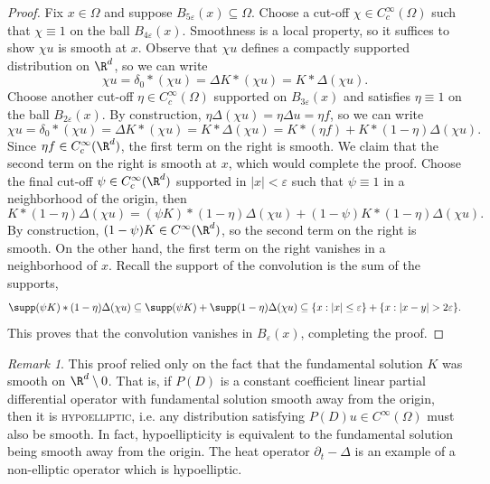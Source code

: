 \documentclass[reqno]{amsart}
\theoremstyle{definition}
\theoremstyle{remark}
\newtheorem*{remark}{Remark}
\renewcommand{\epsilon}{\varepsilon}
\renewcommand{\emph}{\textsc}
\begin{document}
\begin{proof}
	Fix $x \in \Omega$ and suppose $B_{5\epsilon} (x) \subseteq \Omega$. Choose a cut-off $\chi \in C^\infty_c (\Omega)$ such that $\chi \equiv 1$ on the ball $B_{4\epsilon} (x)$. Smoothness is a local property, so it suffices to show $\chi u$ is smooth at $x$. Observe that $\chi u$ defines a compactly supported distribution on $\R^d$, so we can write
		\[ \chi u = \delta_0 * (\chi u) = \Delta K * (\chi u) = K * \Delta (\chi u). \]
	Choose another cut-off $\eta \in C^\infty_c (\Omega)$ supported on $B_{3\epsilon} (x)$ and satisfies $\eta \equiv 1$ on the ball $B_{2\epsilon} (x)$. By construction, $\eta \Delta(\chi u) = \eta \Delta u = \eta f$, so we can write
		\[ \chi u = \delta_0 * (\chi u) = \Delta K * (\chi u) = K * \Delta (\chi u) = K * (\eta f) + K * (1 - \eta) \Delta (\chi u). \]
	Since $\eta f \in C^\infty_c (\R^d)$, the first term on the right is smooth. We claim that the second term on the right is smooth at $x$, which would complete the proof. Choose the final cut-off $\psi \in C^\infty_c (\R^d)$ supported in $|x| < \epsilon$ such that $\psi \equiv 1$ in a neighborhood of the origin, then 
		\[ K * (1 - \eta) \Delta (\chi u) = (\psi K) * (1 - \eta) \Delta (\chi u) + (1 - \psi) K * (1 - \eta) \Delta (\chi u).  \]
	By construction, $(1 - \psi) K \in C^\infty (\R^d)$, so the second term on the right is smooth. On the other hand, the first term on the right vanishes in a neighborhood of $x$. Recall the support of the convolution is the sum of the supports, 
		\[ \supp (\psi K) * (1 - \eta) \Delta (\chi u) \subseteq \supp (\psi K) + \supp (1 - \eta) \Delta (\chi u) \subseteq \{ x:  |x| \leq \epsilon \} + \{ x : |x - y| > 2\epsilon \}. \]
	This proves that the convolution vanishes in $B_\epsilon (x)$, completing the proof. 
\end{proof}

\begin{remark}
	This proof relied only on the fact that the fundamental solution $K$ was smooth on $\R^d \setminus 0$. That is, if $P(D)$ is a constant coefficient linear partial differential operator with fundamental solution smooth away from the origin, then it is \emph{hypoelliptic}, i.e. any distribution satisfying $P(D) u \in C^\infty (\Omega)$ must also be smooth. In fact, hypoellipticity is equivalent to the fundamental solution being smooth away from the origin. The heat operator $\partial_t - \Delta$ is an example of a non-elliptic operator which is hypoelliptic. 
\end{remark}
\end{document}
